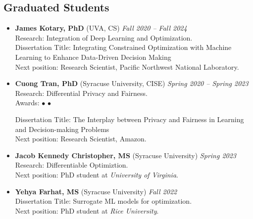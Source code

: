 \subsection*{Graduated Students}
\begin{itemize}
  \item \textbf{James Kotary, PhD} ({\sc UVA}, CS) 
  \hfill{\em Fall 2020 -- Fall 2024}\\
  {\sc Research}: Integration of Deep Learning and Optimization.\\
  {\sc Dissertation Title}: Integrating Constrained Optimization with Machine Learning to Enhance Data-Driven Decision Making\\
  {\sc Next position:} Research Scientist, Pacific Northwest National Laboratory.

  \item \textbf{Cuong Tran, PhD} ({\sc Syracuse University}, CISE) 
  \hfill{\em Spring 2020 -- Spring 2023}\\
  {\sc Research}: Differential Privacy and Fairness.\\
  {\sc Awards:} 
  $\bullet$  
  $\bullet$  

  {\sc Dissertation Title:} The Interplay between Privacy and Fairness in
  Learning and Decision-making Problems\\
  {\sc Next position:} Research Scientist, Amazon.

  \item \textbf{Jacob Kennedy Christopher, MS} ({\sc  Syracuse University}) \hfill{\em Spring 2023}\\
  {\sc Research:} Differentiable Optimiztion.\\
  {\sc Next position:} PhD student at \textit{University of Virginia}.

  \item \textbf{Yehya Farhat, MS} ({\sc Syracuse University}) \hfill{\em Fall 2022}\\
  {\sc Dissertation Title:} Surrogate ML models for optimization.\\
  {\sc Next position:} PhD student at \textit{Rice University}.

\end{itemize}

